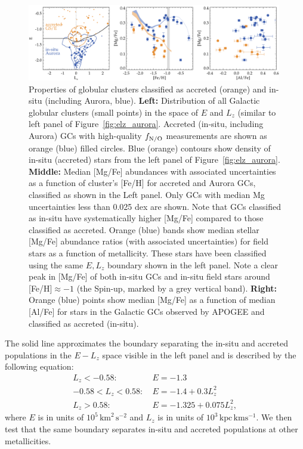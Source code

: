 \documentclass[a4paper,useAMS,usenatbib]{mnras}
\begin{document}
%
\begin{figure}
  \centering
  \includegraphics[width=0.99\textwidth]{img/gc_aurora_accreted_properties.pdf}
  \caption[]{Properties of globular clusters classified as accreted (orange) and in-situ (including Aurora, blue). {\bf Left:} Distribution of all Galactic globular clusters (small points) in the space of $E$ and $L_z$ (similar to left panel of Figure~\ref{fig:elz_aurora}. Accreted (in-situ, including Aurora) GCs with high-quality $f_{\rm N/O}$ measurements are shown as orange (blue) filled circles. Blue (orange) contours show density of in-situ (accreted) stars from the left panel of Figure~\ref{fig:elz_aurora}. {\bf Middle:} Median [Mg/Fe] abundances with associated uncertainties as a function of cluster's [Fe/H] for accreted and Aurora GCs, classified as shown in the Left panel. Only GCs with median Mg uncertainties less than 0.025 dex are shown. Note that GCs classified as in-situ have systematically higher [Mg/Fe] compared to those classified as accreted. Orange (blue) bands show median stellar [Mg/Fe] abundance ratios (with associated uncertainties) for field stars as a function of metallicity. These stars have been classified using the same $E, L_z$ boundary shown in the left panel. Note a clear peak in [Mg/Fe] of both in-situ GCs and in-situ field stars around [Fe/H]$\approx-1$ (the Spin-up, marked by a grey vertical band). {\bf Right:} Orange (blue) points show median [Mg/Fe] as a function of median [Al/Fe] for stars in the Galactic GCs observed by APOGEE and classified as accreted (in-situ).}
   \label{fig:gc_aur_acc}
\end{figure}
%

The solid line approximates 
the boundary separating the in-situ and accreted populations in the $E-L_z$ space visible in the left panel and is described by the following equation: 
\begin{align}
\label{eq:sel}
      L_z<-0.58:~ &	E=-1.3 \nonumber \\
-0.58<L_z<0.58:~ &	E=-1.4+0.3L_z^2\\
          L_z>0.58:~	&	E=-1.325+0.075L_z^2, \nonumber
\end{align}
where $E$ is in units of $10^5\, \mathrm{km}^2\,\mathrm{s}^{-2}$ and $L_z$ is in units of $10^3\,\mathrm{kpc}\,\mathrm{km}\mathrm{ s}^{-1}$. 
We then test that the same boundary separates in-situ and accreted populations at other metallicities. 
\end{document}
